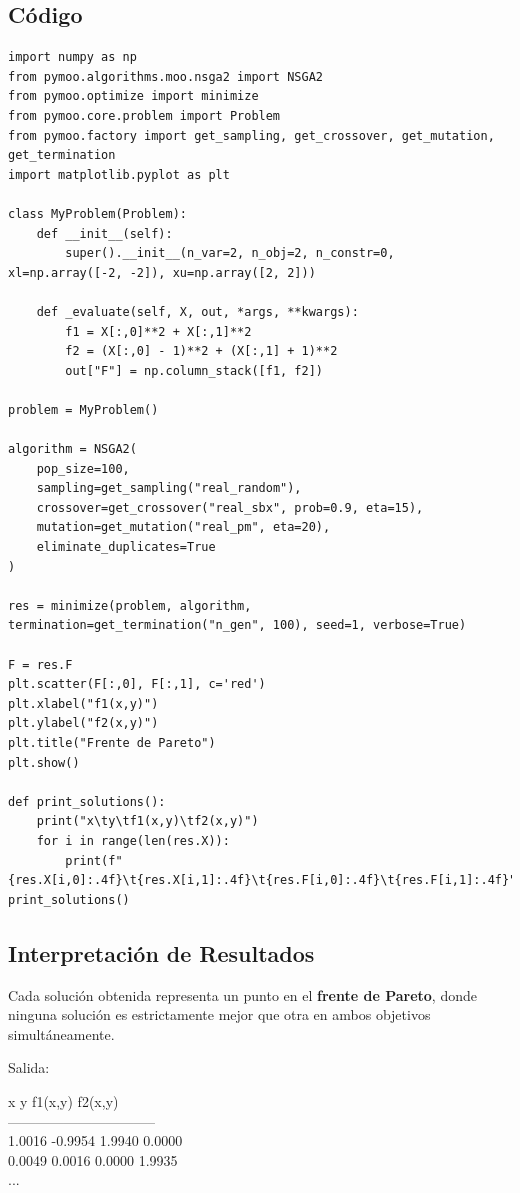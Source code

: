 \documentclass[12pt]{article}
\begin{document}
\subsection*{Código}
\begin{lstlisting}[style=python]
import numpy as np
from pymoo.algorithms.moo.nsga2 import NSGA2
from pymoo.optimize import minimize
from pymoo.core.problem import Problem
from pymoo.factory import get_sampling, get_crossover, get_mutation, get_termination
import matplotlib.pyplot as plt

class MyProblem(Problem):
    def __init__(self):
        super().__init__(n_var=2, n_obj=2, n_constr=0, xl=np.array([-2, -2]), xu=np.array([2, 2]))
    
    def _evaluate(self, X, out, *args, **kwargs):
        f1 = X[:,0]**2 + X[:,1]**2
        f2 = (X[:,0] - 1)**2 + (X[:,1] + 1)**2
        out["F"] = np.column_stack([f1, f2])

problem = MyProblem()

algorithm = NSGA2(
    pop_size=100,
    sampling=get_sampling("real_random"),
    crossover=get_crossover("real_sbx", prob=0.9, eta=15),
    mutation=get_mutation("real_pm", eta=20),
    eliminate_duplicates=True
)

res = minimize(problem, algorithm, termination=get_termination("n_gen", 100), seed=1, verbose=True)

F = res.F
plt.scatter(F[:,0], F[:,1], c='red')
plt.xlabel("f1(x,y)")
plt.ylabel("f2(x,y)")
plt.title("Frente de Pareto")
plt.show()

def print_solutions():
    print("x\ty\tf1(x,y)\tf2(x,y)")
    for i in range(len(res.X)):
        print(f"{res.X[i,0]:.4f}\t{res.X[i,1]:.4f}\t{res.F[i,0]:.4f}\t{res.F[i,1]:.4f}")
print_solutions()
\end{lstlisting}

\subsection*{Interpretación de Resultados}

Cada solución obtenida representa un punto en el \textbf{frente de Pareto}, donde ninguna solución es estrictamente mejor que otra en ambos objetivos simultáneamente.

Salida:
\begin{center}
\ttfamily
 x       y       f1(x,y)  f2(x,y) \\
-------------------------------- \\
1.0016  -0.9954  1.9940   0.0000 \\
0.0049   0.0016  0.0000   1.9935 \\
...
\end{center}
\end{document}
